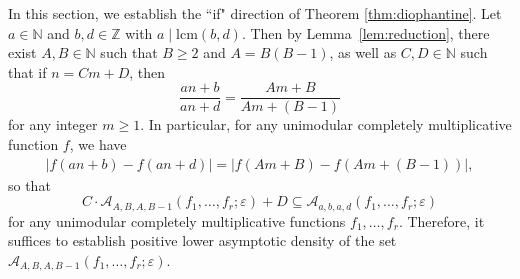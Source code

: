 \documentclass[12pt, reqno, a4paper]{amsart}
\theoremstyle{definition}
\theoremstyle{remark}
\numberwithin{equation}{section}
\newcommand{\N}{\mathbb{N}}
\renewcommand{\geq}{\geqslant}
\newcommand{\eps}{\varepsilon}
\begin{document}
In this section, we establish the ``if" direction of Theorem \ref{thm:diophantine}. Let \( a \in \mathbb{N} \) and \( b, d \in \mathbb{Z} \) with \( a \mid \mathrm{lcm}(b,d) \). Then by Lemma~\ref{lem:reduction}, there exist \( A, B \in \mathbb{N} \) such that \( B \geq 2 \) and \( A = B(B-1) \), as well as \( C, D \in \mathbb{N} \) such that if \( n = C m + D \), then
\[
\frac{a n + b}{a n + d} = \frac{A m + B}{A m + (B - 1)}
\]
for any integer \( m \geq 1 \). In particular, for any unimodular completely multiplicative function $f$, we have 
\begin{align*}
|f(an+b)-f(an+d)| = |f(Am+B)-f(Am+(B-1))|,
\end{align*}
so that
 \[ C\cdot \mathcal{A}_{A,B,A,B-1}(f_1,\ldots,f_r;\eps) + D \subseteq \mathcal{A}_{a,b,a,d}(f_1,\ldots,f_r;\eps) \]
 for any unimodular completely multiplicative functions $f_1,\ldots,f_r.$
 Therefore, it suffices to establish positive lower asymptotic density of the set $\mathcal{A}_{A,B,A,B-1}(f_1,\ldots,f_r;\eps)$.
\end{document}
